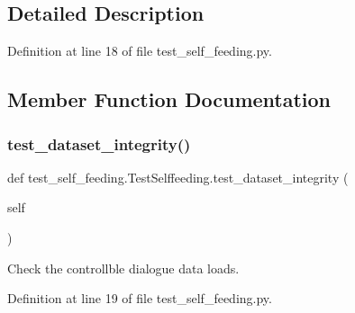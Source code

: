 \subsection{Detailed Description}


Definition at line 18 of file test\+\_\+self\+\_\+feeding.\+py.



\subsection{Member Function Documentation}
\mbox{\label{classtest__self__feeding_1_1TestSelffeeding_a73a16fe92177da1bedaa79fb15f6e937}} 
\subsubsection{\texorpdfstring{test\+\_\+dataset\+\_\+integrity()}{test\_dataset\_integrity()}}
{\footnotesize\ttfamily def test\+\_\+self\+\_\+feeding.\+Test\+Selffeeding.\+test\+\_\+dataset\+\_\+integrity (\begin{DoxyParamCaption}\item[{}]{self }\end{DoxyParamCaption})}

\begin{DoxyVerb}Check the controllble dialogue data loads.
\end{DoxyVerb}
 

Definition at line 19 of file test\+\_\+self\+\_\+feeding.\+py.


